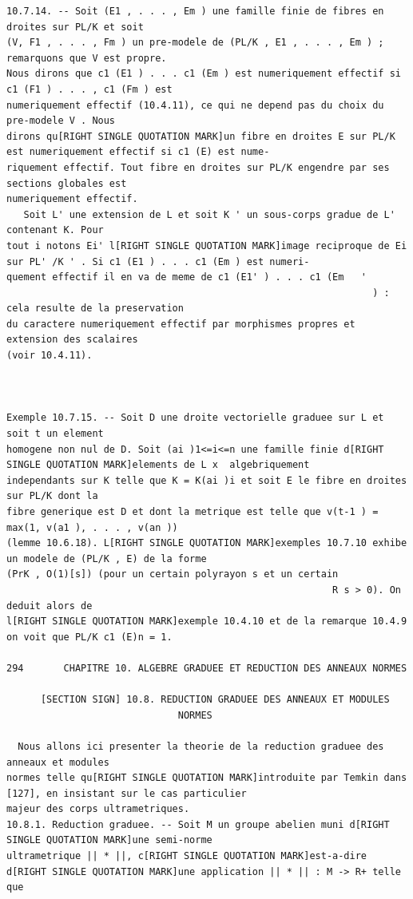 \documentclass[
  11pt,
]{article}
\begin{document}
\begin{lstlisting}
10.7.14. -- Soit (E1 , . . . , Em ) une famille finie de fibres en droites sur PL/K et soit
(V, F1 , . . . , Fm ) un pre-modele de (PL/K , E1 , . . . , Em ) ; remarquons que V est propre.
Nous dirons que c1 (E1 ) . . . c1 (Em ) est numeriquement effectif si c1 (F1 ) . . . , c1 (Fm ) est
numeriquement effectif (10.4.11), ce qui ne depend pas du choix du pre-modele V . Nous
dirons qu[RIGHT SINGLE QUOTATION MARK]un fibre en droites E sur PL/K est numeriquement effectif si c1 (E) est nume-
riquement effectif. Tout fibre en droites sur PL/K engendre par ses sections globales est
numeriquement effectif.
   Soit L' une extension de L et soit K ' un sous-corps gradue de L' contenant K. Pour
tout i notons Ei' l[RIGHT SINGLE QUOTATION MARK]image reciproque de Ei sur PL' /K ' . Si c1 (E1 ) . . . c1 (Em ) est numeri-
quement effectif il en va de meme de c1 (E1' ) . . . c1 (Em   '
                                                                ) : cela resulte de la preservation
du caractere numeriquement effectif par morphismes propres et extension des scalaires
(voir 10.4.11).



Exemple 10.7.15. -- Soit D une droite vectorielle graduee sur L et soit t un element
homogene non nul de D. Soit (ai )1<=i<=n une famille finie d[RIGHT SINGLE QUOTATION MARK]elements de L x  algebriquement
independants sur K telle que K = K(ai )i et soit E le fibre en droites sur PL/K dont la
fibre generique est D et dont la metrique est telle que v(t-1 ) = max(1, v(a1 ), . . . , v(an ))
(lemme 10.6.18). L[RIGHT SINGLE QUOTATION MARK]exemples 10.7.10 exhibe un modele de (PL/K , E) de la forme
(PrK , O(1)[s]) (pour un certain polyrayon s et un certain
                                                         R s > 0). On deduit alors de
l[RIGHT SINGLE QUOTATION MARK]exemple 10.4.10 et de la remarque 10.4.9 on voit que PL/K c1 (E)n = 1.

294       CHAPITRE 10. ALGEBRE GRADUEE ET REDUCTION DES ANNEAUX NORMES

      [SECTION SIGN] 10.8. REDUCTION GRADUEE DES ANNEAUX ET MODULES
                              NORMES

  Nous allons ici presenter la theorie de la reduction graduee des anneaux et modules
normes telle qu[RIGHT SINGLE QUOTATION MARK]introduite par Temkin dans [127], en insistant sur le cas particulier
majeur des corps ultrametriques.
10.8.1. Reduction graduee. -- Soit M un groupe abelien muni d[RIGHT SINGLE QUOTATION MARK]une semi-norme
ultrametrique || * ||, c[RIGHT SINGLE QUOTATION MARK]est-a-dire d[RIGHT SINGLE QUOTATION MARK]une application || * || : M -> R+ telle que


\end{lstlisting}
\end{document}
